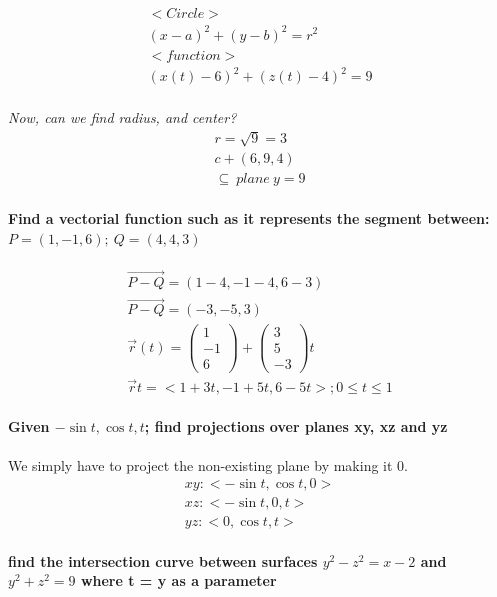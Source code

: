 \documentclass[11pt,fleqn]{book} %
\begin{document}
\begin{gather}
    <Circle>\\
    (x-a)^2 + (y-b)^2 = r^2\\
    <function>\\
    (x(t)-6)^2 + (z(t)-4)^2 = 9\\
\end{gather}

\textit{Now, can we find radius, and center?}
\begin{gather}
    r = \sqrt{9} = 3\\
    c + (6,9,4)\\
    \subseteq  \ plane \ y = 9
\end{gather}

\paragraph{Find a vectorial function such as it represents the segment between:$P=(1,-1,6); \ Q=(4,4,3)$}
\begin{gather}
    \vec{P-Q} = (1 - 4, -1 -4, 6-3)\\
    \vec{P-Q} = (-3, -5, 3)\\
    \vec{r} (t) = \begin{pmatrix}
        1 \\
        -1\\
        6
    \end{pmatrix} + \begin{pmatrix}
        3 \\
        5\\
        -3
    \end{pmatrix} t\\
    \vec{r} t = <1+3t, -1+5t, 6-5t>; 0 \leq t \leq 1
\end{gather}

\paragraph*{Given $- \sin t, \cos t, t$; find projections over planes xy, xz and yz}
We simply have to project the non-existing plane by making it 0.
\begin{gather}
    xy: <- \sin t, \cos t, 0>\\
    xz: <-\sin t,0,t>\\
    yz: <0, \cos t, t>
\end{gather}

\paragraph*{find the intersection curve between surfaces $y^2 - z^2 = x-2$ and $y^2 + z^2 = 9$
where t = y as a parameter}
\end{document}
